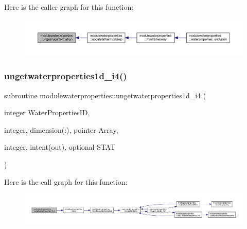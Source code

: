 Here is the caller graph for this function\+:\nopagebreak
\begin{figure}[H]
\begin{center}
\leavevmode
\includegraphics[width=350pt]{namespacemodulewaterproperties_ab369effb692dc27866518b2a5fa9fe1b_icgraph}
\end{center}
\end{figure}
\mbox{\label{namespacemodulewaterproperties_a595720f235e82fd22fab49105706b84e}} 
\subsubsection{\texorpdfstring{ungetwaterproperties1d\+\_\+i4()}{ungetwaterproperties1d\_i4()}}
{\footnotesize\ttfamily subroutine modulewaterproperties\+::ungetwaterproperties1d\+\_\+i4 (\begin{DoxyParamCaption}\item[{integer}]{Water\+Properties\+ID,  }\item[{integer, dimension(\+:), pointer}]{Array,  }\item[{integer, intent(out), optional}]{S\+T\+AT }\end{DoxyParamCaption})\hspace{0.3cm}{\ttfamily [private]}}

Here is the call graph for this function\+:\nopagebreak
\begin{figure}[H]
\begin{center}
\leavevmode
\includegraphics[width=350pt]{namespacemodulewaterproperties_a595720f235e82fd22fab49105706b84e_cgraph}
\end{center}
\end{figure}
\mbox{\label{namespacemodulewaterproperties_ab8a50929e1e5fe0ebe591654fa4fd52f}} 
